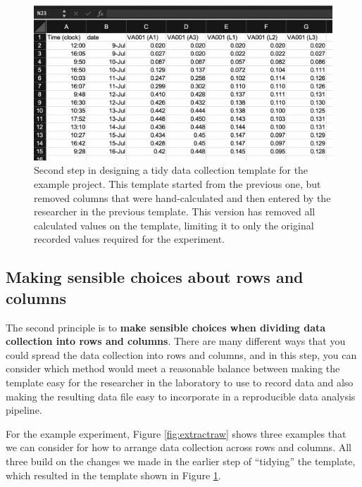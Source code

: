 \documentclass[]{tufte-book}
\begin{document}
\begin{figure}
\includegraphics[width=\textwidth]{figures/growth_curve_step2} \caption[Second step in designing a tidy data collection template for the example project]{Second step in designing a tidy data collection template for the example project. This template started from the previous one, but removed columns that were hand-calculated and then entered by the researcher in the previous template. This version has removed all calculated values on the template, limiting it to only the original recorded values required for the experiment.}\label{fig:step2}
\end{figure}

\hypertarget{making-sensible-choices-about-rows-and-columns}{%
\subsection{Making sensible choices about rows and columns}\label{making-sensible-choices-about-rows-and-columns}}

The second principle is to \textbf{make sensible choices when dividing data collection
into rows and columns}. There are many different ways that you could spread the
data collection into rows and columns, and in this step, you can consider which
method would meet a reasonable balance between making the template easy for the
researcher in the laboratory to use to record data and also making the resulting
data file easy to incorporate in a reproducible data analysis pipeline.

For the example experiment, Figure \ref{fig:extractraw} shows three examples
that we can consider for how to arrange data collection across rows and columns.
All three build on the changes we made in the earlier step of ``tidying'' the template,
which resulted in the template shown in Figure \ref{fig:step2}.
\end{document}
